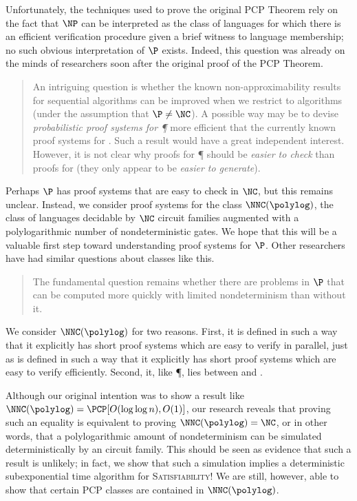 \documentclass{article}
\newcommand{\loglog}{\log\log}
\begin{document}
Unfortunately, the techniques used to prove the original PCP Theorem rely on the fact that $\NP$ can be interpreted as the class of languages for which there is an efficient verification procedure given a brief witness to language membership; no such obvious interpretation of $\P$ exists.
Indeed, this question was already on the minds of researchers soon after the original proof of the PCP Theorem.
\begin{quote}
  An intriguing question is whether the known non-approximability results for sequential algorithms can be improved when we restrict to \NC{} algorithms (under the assumption that $\P \neq \NC$).
  A possible way may be to devise \emph{probabilistic proof systems for \P} more efficient that the currently known proof systems for \NP{}.
  Such a result would have a great independent interest.
  However, it is not clear why proofs for \P{} should be \emph{easier to check} than proofs for \NP{} (they only appear to be \emph{easier to generate}).~\autocite{trevisan98}
\end{quote}
Perhaps $\P$ has proof systems that are easy to check in $\NC$, but this remains unclear.
Instead, we consider proof systems for the class $\NNC(\polylog)$, the class of languages decidable by $\NC$ circuit families augmented with a polylogarithmic number of nondeterministic gates.
We hope that this will be a valuable first step toward understanding proof systems for $\P$.
Other researchers have had similar questions about classes like this.
\begin{quote}
  The fundamental question remains whether there are problems in $\P$ that can be computed more quickly with limited nondeterminism than without it.~\autocite{bg93}
\end{quote}
We consider $\NNC(\polylog)$ for two reasons.
First, it is defined in such a way that it explicitly has short proof systems which are easy to verify in parallel, just as \NP{} is defined in such a way that it explicitly has short proof systems which are easy to verify efficiently.
Second, it, like \P, lies between \NC{} and \NP{}.

Although our original intention was to show a result like $\NNC(\polylog) = \PCP[O(\loglog n), O(1)]$, our research reveals that proving such an equality is equivalent to proving $\NNC(\polylog) = \NC$, or in other words, that a polylogarithmic amount of nondeterminism can be simulated deterministically by an \NC{} circuit family.
This should be seen as evidence that such a result is unlikely; in fact, we show that such a simulation implies a deterministic subexponential time algorithm for \textsc{Satisfiability}!
We are still, however, able to show that certain PCP classes are contained in $\NNC(\polylog)$.
\end{document}
